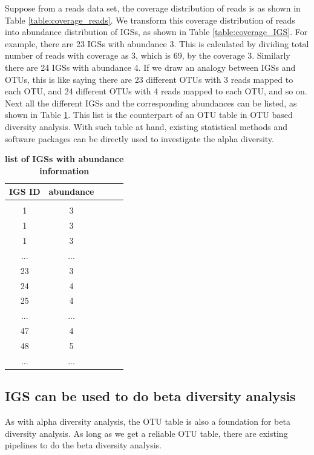 Suppose from a reads data set, the coverage distribution of reads is as 
shown in Table \ref{table:coverage_reads}. We transform this coverage distribution
of reads into abundance distribution of IGSs, as shown in Table \ref{table:coverage_IGS}.
For example, there are 23 IGSs with abundance 3. This is calculated by dividing  
total number of reads with coverage as 3, which is 69, by the coverage 3.
Similarly there are 24 IGSs with abundance 4. 
If we draw an analogy between IGSs and OTUs, this is like saying there are 23 
different OTUs with 3 reads mapped to each OTU, and 24 different OTUs with 4 reads mapped to each OTU, and so on.
Next all the different IGSs and the corresponding abundances can be listed,
as shown in Table \ref{table:list_IGS}. This list is the counterpart of an 
OTU table in OTU based diversity analysis.
With such table at hand, existing statistical methods and software 
packages can be directly used to investigate the alpha diversity.  


\begin{table}[!ht]
\caption{
\bf{list of IGSs with abundance information}
}
\begin{tabular}{ |c | c |c| c|c| }
IGS ID & abundance \\
\hline \\
1                   & 3  \\
1                 & 3  \\
1                  & 3 \\
...        & ... \\
23        & 3 \\
24        & 4 \\
25        & 4 \\
...        & ... \\
47        & 4 \\
48        & 5 \\
...        & ... \\
\end{tabular}
\begin{flushleft}
\end{flushleft}
\label{table:list_IGS}
\end{table}




\subsection{IGS can be used to do beta diversity analysis}

As with alpha diversity analysis, the OTU table is also a foundation for beta 
diversity analysis. As long as we get a reliable OTU table, there are existing 
pipelines to do the beta diversity analysis. 

